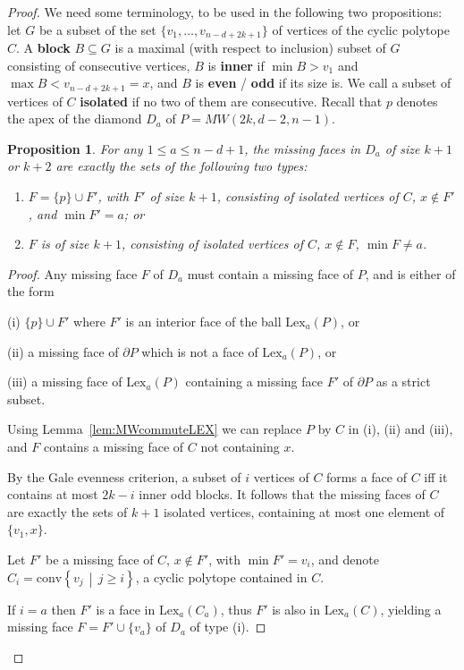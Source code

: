 \documentclass[a4paper,leqno]{article}
\newtheorem{proposition}[theorem]{Proposition}
\theoremstyle{definition}
\newcommand{\conv}{\mathrm{conv}}
\newcommand{\lex}{\mathrm{Lex}}
\newcommand{\set}[2]{\left\{ #1\,\middle|\, #2\right\}}
\begin{document}
\begin{proof}
We need some terminology, to be used in the following two propositions:
let $G$ be a subset of the set $\{v_1, \ldots, v_{n-d+2k+1}\}$ of vertices of the cyclic polytope $C$. A {\bf block} $B \subseteq G$ is a maximal (with respect to inclusion) subset of $G$ consisting of consecutive vertices, $B$ is {\bf inner} if $\min B>v_1$ and $\max B<v_{n-d+2k+1}=x$, and $B$ is {\bf even} / {\bf odd} if its size is. We call a subset of vertices of $C$ {\bf isolated} if no two of them are consecutive. Recall that $p$ denotes the apex of the diamond $D_a$ of $P=MW(2k,d-2,n-1)$.

\begin{proposition}\label{prop:missing_faces}
For any $1\le a\le n-d+1$, the missing faces in $D_a$ of size $k+1$ or $k+2$ are exactly the sets of the following two types:
\begin{enumerate}[(1)]
	\item $F=\{p\} \cup F'$, with $F'$ of size $k+1$, consisting of isolated vertices of $C$, $x\notin F'$, and $\min F'=a$; or
	\item $F$ is of size $k+1$, consisting of isolated vertices of $C$, $x\notin F$, $\min F\neq a$.
\end{enumerate}
\end{proposition}
\begin{proof}
Any missing face $F$ of $D_a$ must contain a missing face of $P$, and
is either of the form

(i) $\{p\} \cup F'$ where $F'$ is an interior face of the ball $\lex_a(P)$, or

(ii) a missing face of $\partial P$ which is not a face of $\lex_a(P)$, or %

(iii) a missing face of $\lex_a(P)$ containing a missing face $F'$ of $\partial P$ as a strict subset.

Using Lemma~\ref{lem:MWcommuteLEX} we can replace $P$ by $C$ in (i), (ii) and (iii), and $F$ contains a missing face of $C$ not containing $x$.

By the Gale evenness criterion, a subset of $i$ vertices of $C$ forms a face of $C$ iff it contains at most $2k-i$ inner odd blocks. It follows that the missing faces of $C$ are exactly the sets of $k+1$ isolated vertices, containing at most one element of $\{v_1,x\}$.

Let $F'$ be a missing face of $C$, $x\notin F'$, with $\min F'=v_i$, and denote $C_i=\conv\set{v_j}{j\geq i}$, a cyclic polytope contained in $C$.

If $i=a$ then $F'$ is a face in $\lex_a(C_a)$, thus $F'$ is also in $\lex_a(C)$, yielding a missing face $F=F' \cup \{v_a\}$ of $D_a$ of type (i).


\end{proof}
\end{proof}
\end{document}
